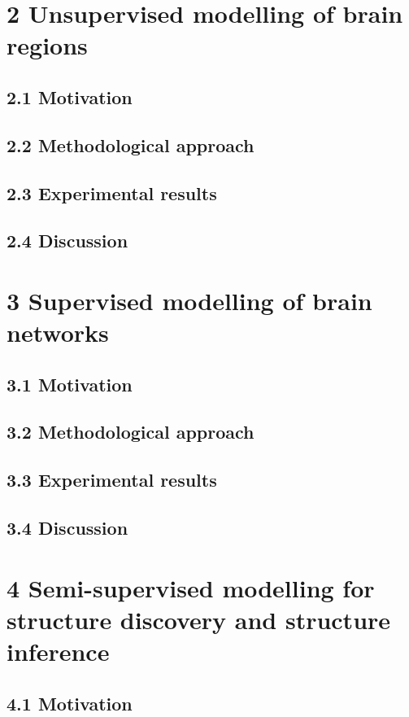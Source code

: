 \documentclass[authoryear,review,3p]{elsarticle}
\begin{document}
\section*{2 Unsupervised modelling of brain regions}

\subsection*{2.1 Motivation}
\subsection*{2.2 Methodological approach}
\subsection*{2.3 Experimental results}
\subsection*{2.4 Discussion}


\bigskip
\section*{3 Supervised modelling of brain networks}

\subsection*{3.1 Motivation}
\subsection*{3.2 Methodological approach}
\subsection*{3.3 Experimental results}
\subsection*{3.4 Discussion}

\bigskip
\section*{4 Semi-supervised modelling for structure discovery
and structure inference}

\subsection*{4.1 Motivation}
\end{document}

